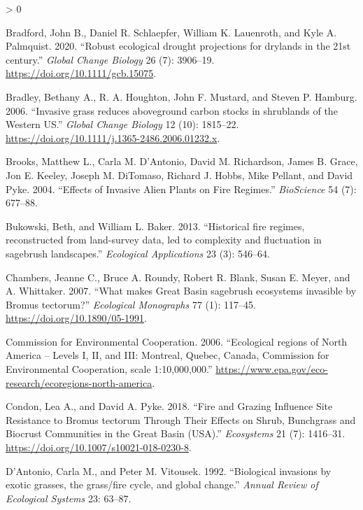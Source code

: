 \documentclass[
  12pt,
]{article}
\newlength{\cslhangindent}
\newenvironment{CSLReferences}[2] %
 {%
  \setlength{\parindent}{0pt}
  \ifodd #1 \everypar{\setlength{\hangindent}{\cslhangindent}}\ignorespaces\fi
  \ifnum #2 > 0
  \setlength{\parskip}{#2\baselineskip}
  \fi
 }%
 {}
\begin{document}
\begin{CSLReferences}{1}{0}
\leavevmode\hypertarget{ref-Bradford2020}{}%
Bradford, John B., Daniel R. Schlaepfer, William K. Lauenroth, and Kyle
A. Palmquist. 2020. {``{Robust ecological drought projections for
drylands in the 21st century}.''} \emph{Global Change Biology} 26 (7):
3906--19. \url{https://doi.org/10.1111/gcb.15075}.

\leavevmode\hypertarget{ref-Bradley2006}{}%
Bradley, Bethany A., R. A. Houghton, John F. Mustard, and Steven P.
Hamburg. 2006. {``{Invasive grass reduces aboveground carbon stocks in
shrublands of the Western US}.''} \emph{Global Change Biology} 12 (10):
1815--22. \url{https://doi.org/10.1111/j.1365-2486.2006.01232.x}.

\leavevmode\hypertarget{ref-Brooks2004}{}%
Brooks, Matthew L., Carla M. D'Antonio, David M. Richardson, James B.
Grace, Jon E. Keeley, Joseph M. DiTomaso, Richard J. Hobbs, Mike
Pellant, and David Pyke. 2004. {``{Effects of Invasive Alien Plants on
Fire Regimes}.''} \emph{BioScience} 54 (7): 677--88.

\leavevmode\hypertarget{ref-Bukowski2013}{}%
Bukowski, Beth, and William L. Baker. 2013. {``{Historical fire regimes,
reconstructed from land-survey data, led to complexity and fluctuation
in sagebrush landscapes}.''} \emph{Ecological Applications} 23 (3):
546--64.

\leavevmode\hypertarget{ref-Chambers2007}{}%
Chambers, Jeanne C., Bruce A. Roundy, Robert R. Blank, Susan E. Meyer,
and A. Whittaker. 2007. {``{What makes Great Basin sagebrush ecosystems
invasible by Bromus tectorum?}''} \emph{Ecological Monographs} 77 (1):
117--45. \url{https://doi.org/10.1890/05-1991}.

\leavevmode\hypertarget{ref-CEC2006}{}%
Commission for Environmental Cooperation. 2006. {``{Ecological regions
of North America -- Levels I, II, and III: Montreal, Quebec, Canada,
Commission for Environmental Cooperation, scale 1:10,000,000}.''}
\url{https://www.epa.gov/eco-research/ecoregions-north-america}.

\leavevmode\hypertarget{ref-Condon2018}{}%
Condon, Lea A., and David A. Pyke. 2018. {``{Fire and Grazing Influence
Site Resistance to Bromus tectorum Through Their Effects on Shrub,
Bunchgrass and Biocrust Communities in the Great Basin (USA)}.''}
\emph{Ecosystems} 21 (7): 1416--31.
\url{https://doi.org/10.1007/s10021-018-0230-8}.

\leavevmode\hypertarget{ref-DAntonio1992}{}%
D'Antonio, Carla M., and Peter M. Vitousek. 1992. {``{Biological
invasions by exotic grasses, the grass/fire cycle, and global
change}.''} \emph{Annual Review of Ecological Systems} 23: 63--87.


\end{CSLReferences}
\end{document}
